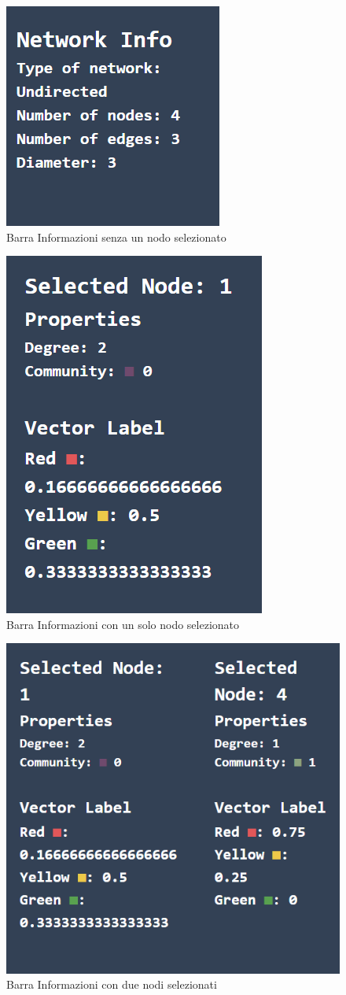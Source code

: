 \documentclass[a4paper,12pt]{report}
\begin{document}
			\begin{center}
				\begin{figure}[H]
				\centering
				\includegraphics[width=0.4\linewidth]{infobargeneral}
				\caption{Barra Informazioni senza un nodo selezionato}
				\end{figure}
				\begin{figure}[H]
				\centering
				\includegraphics[width=0.4\linewidth]{infobar1}
				\caption{Barra Informazioni con un solo nodo selezionato}
				\end{figure}
				\begin{figure}[H]
				\centering
				\includegraphics[width=0.6\linewidth]{infobar2}
				\caption{Barra Informazioni con due nodi selezionati}
				\end{figure}
			\end{center}
			
\end{document}
